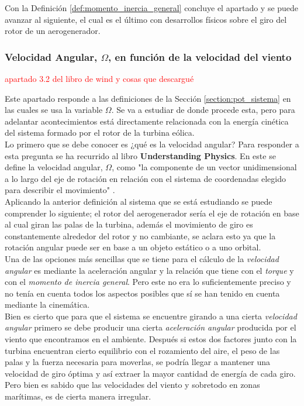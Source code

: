 Con la Definición \ref{def:momento_inercia_general} concluye el apartado y se puede avanzar al siguiente, el cual es el último con desarrollos físicos sobre el giro del rotor de un aerogenerador.
 
\subsubsection{Velocidad Angular, $\Omega$, en función de la velocidad del viento }

\textcolor{red}{apartado 3.2 del libro de wind y cosas que descargué}

Este apartado responde a las definiciones de la Sección \ref{section:pot_sistema} en las cuales se usa la variable $\Omega$. Se va a estudiar de donde procede esta, pero para adelantar acontecimientos está directamente relacionada con la energía cinética del sistema formado por el rotor de la turbina eólica.\\

Lo primero que se debe conocer es ¿qué es la velocidad angular? Para responder a esta pregunta se ha recurrido al libro \textbf{Understanding Physics}. En este se define la velocidad angular, $\Omega$, como "la componente de un vector unidimensional a lo largo del eje de rotación en relación con el sistema de coordenadas elegido para describir el movimiento" \cite[p.~303]{cummings2004understanding}.\\

Aplicando la anterior definición al sistema que se está estudiando se puede comprender lo siguiente; el rotor del aerogenerador sería el eje de rotación en base al cual giran las palas de la turbina, además el movimiento de giro es constantemente alrededor del rotor y no cambiante, se aclara esto ya que la rotación angular puede ser en base a un objeto estático o a uno orbital.\\

Una de las opciones más sencillas que se tiene para el cálculo de la \textit{velocidad angular} es mediante la aceleración angular y la relación que tiene con el \textit{torque} y con el \textit{momento de inercia general}. Pero este no era lo suficientemente preciso y no tenía en cuenta todos los aspectos posibles que sí se han tenido en cuenta mediante la cinemática. \\
 
Bien es cierto que para que el sistema se encuentre girando a una cierta \textit{velocidad angular} primero se debe producir una cierta \textit{aceleración angular} producida por el viento que encontramos en el ambiente. Después si estos dos factores junto con la turbina encuentran cierto equilibrio con el rozamiento del aire, el peso de las palas y la fuerza necesaria para moverlas, se podría llegar a mantener una velocidad de giro óptima y así extraer la mayor cantidad de energía de cada giro. Pero bien es sabido que las velocidades del viento y sobretodo en zonas marítimas, es de cierta manera irregular.\\

